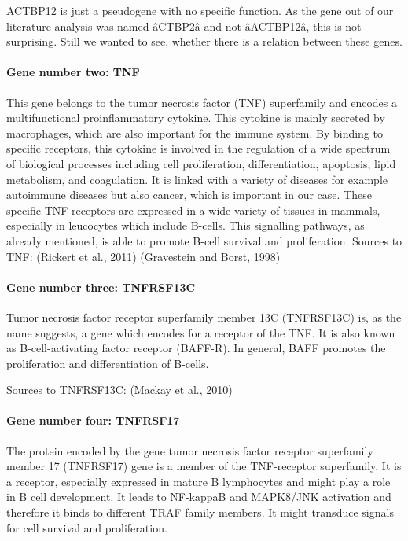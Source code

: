\documentclass[]{article}
\let\oldparagraph\paragraph
\renewcommand{\paragraph}[1]{\oldparagraph{#1}\mbox{}}
\begin{document}
ACTBP12 is just a pseudogene with no specific function. As the gene out
of our literature analysis was named âCTBP2â and not âACTBP12â,
this is not surprising. Still we wanted to see, whether there is a
relation between these genes.

\paragraph{Gene number two: TNF}\label{gene-number-two-tnf}

This gene belongs to the tumor necrosis factor (TNF) superfamily and
encodes a multifunctional proinflammatory cytokine. This cytokine is
mainly secreted by macrophages, which are also important for the immune
system. By binding to specific receptors, this cytokine is involved in
the regulation of a wide spectrum of biological processes including cell
proliferation, differentiation, apoptosis, lipid metabolism, and
coagulation. It is linked with a variety of diseases for example
autoimmune diseases but also cancer, which is important in our case.
These specific TNF receptors are expressed in a wide variety of tissues
in mammals, especially in leucocytes which include B-cells. This
signalling pathways, as already mentioned, is able to promote B-cell
survival and proliferation. Sources to TNF: (Rickert et al., 2011)
(Gravestein and Borst, 1998)

\paragraph{Gene number three:
TNFRSF13C}\label{gene-number-three-tnfrsf13c}

Tumor necrosis factor receptor superfamily member 13C (TNFRSF13C) is, as
the name suggests, a gene which encodes for a receptor of the TNF. It is
also known as B-cell-activating factor receptor (BAFF-R). In general,
BAFF promotes the proliferation and differentiation of B-cells.

Sources to TNFRSF13C: (Mackay et al., 2010)

\paragraph{Gene number four: TNFRSF17}\label{gene-number-four-tnfrsf17}

The protein encoded by the gene tumor necrosis factor receptor
superfamily member 17 (TNFRSF17) gene is a member of the TNF-receptor
superfamily. It is a receptor, especially expressed in mature B
lymphocytes and might play a role in B cell development. It leads to
NF-kappaB and MAPK8/JNK activation and therefore it binds to different
TRAF family members. It might transduce signals for cell survival and
proliferation.
\end{document}
